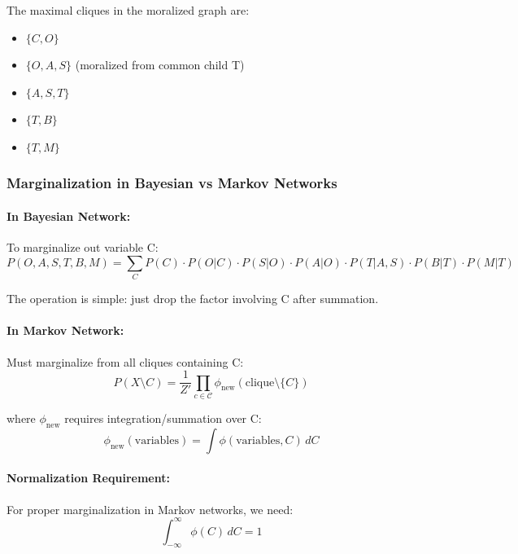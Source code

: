 \documentclass[conference]{IEEEtran}
\begin{document}
The maximal cliques in the moralized graph are:
\begin{itemize}
    \item $\{C, O\}$
    \item $\{O, A, S\}$ (moralized from common child T)
    \item $\{A, S, T\}$
    \item $\{T, B\}$
    \item $\{T, M\}$
\end{itemize}

\subsubsection{Marginalization in Bayesian vs Markov Networks}

\paragraph{In Bayesian Network:}
To marginalize out variable C:
\begin{equation}
P(O,A,S,T,B,M) = \sum_C P(C) \cdot P(O|C) \cdot P(S|O) \cdot P(A|O) \cdot P(T|A,S) \cdot P(B|T) \cdot P(M|T)
\end{equation}

The operation is simple: just drop the factor involving C after summation.

\paragraph{In Markov Network:}
Must marginalize from all cliques containing C:
\begin{equation}
P(X \setminus C) = \frac{1}{Z'} \prod_{c \in \mathcal{C}} \phi_{\text{new}}(\text{clique} \setminus \{C\})
\end{equation}

where $\phi_{\text{new}}$ requires integration/summation over C:
\begin{equation}
\phi_{\text{new}}(\text{variables}) = \int \phi(\text{variables}, C) \, dC
\end{equation}

\paragraph{Normalization Requirement:}
For proper marginalization in Markov networks, we need:
\begin{equation}
\int_{-\infty}^{\infty} \phi(C) \, dC = 1
\end{equation}
\end{document}
